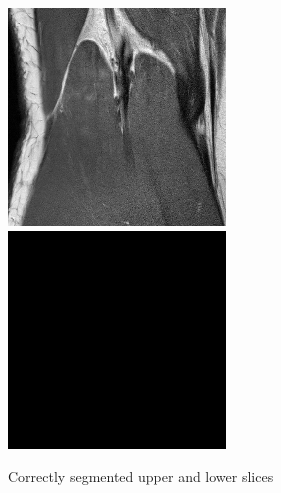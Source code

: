 \begin{figure}[H]
\endminipage\hfill
{}%
  \includegraphics[width=\linewidth]{imgs/a6.png}
\endminipage\hfill
{}%
  \includegraphics[width=\linewidth]{imgs/b6.png}
\endminipage
\caption{Correctly segmented upper and lower slices}
\end{figure}


